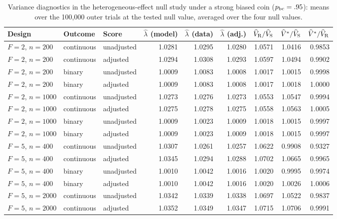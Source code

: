 \documentclass[12pt,a4paper]{article}
\theoremstyle{definition}
\theoremstyle{remark}\newtheorem{remark}{Remark}
\numberwithin{equation}{section}
\begin{document}
\begin{table}[!htbp]\centering
\caption{Variance diagnostics in the heterogeneous-effect null study under a strong biased coin ($p_{\rm bc}=.95$): means over the 100,000 outer trials at the tested null value, averaged over the four null values.}
\label{tab:supp-hetero-diag-stress}
\begin{threeparttable}\begin{singlespace}\footnotesize\setlength{\tabcolsep}{3pt}
\begin{tabular}{@{}lllrrrrrr@{}}\toprule
Design & Outcome & Score & $\widehat\lambda$ (model) & $\widehat\lambda$ (data) & $\widehat\lambda$ (adj.) & $\widehat V_{\rm R}/\widehat V_{\rm S}$ & $\widehat V^{*}/\widehat V_{\rm S}$ & $\widehat V^{*}/\widehat V_{\rm R}$\\\midrule
$F=2$, $n=200$ & continuous & unadjusted & 1.0281 & 1.0295 & 1.0280 & 1.0571 & 1.0416 & 0.9853\\
$F=2$, $n=200$ & continuous & adjusted & 1.0294 & 1.0308 & 1.0293 & 1.0597 & 1.0494 & 0.9902\\
$F=2$, $n=200$ & binary & unadjusted & 1.0009 & 1.0083 & 1.0008 & 1.0017 & 1.0015 & 0.9998\\
$F=2$, $n=200$ & binary & adjusted & 1.0009 & 1.0083 & 1.0008 & 1.0017 & 1.0018 & 1.0000\\
$F=2$, $n=1000$ & continuous & unadjusted & 1.0273 & 1.0276 & 1.0273 & 1.0553 & 1.0547 & 0.9994\\
$F=2$, $n=1000$ & continuous & adjusted & 1.0275 & 1.0278 & 1.0275 & 1.0558 & 1.0563 & 1.0005\\
$F=2$, $n=1000$ & binary & unadjusted & 1.0009 & 1.0023 & 1.0009 & 1.0018 & 1.0015 & 0.9997\\
$F=2$, $n=1000$ & binary & adjusted & 1.0009 & 1.0023 & 1.0009 & 1.0018 & 1.0015 & 0.9997\\
$F=5$, $n=400$ & continuous & unadjusted & 1.0307 & 1.0261 & 1.0257 & 1.0622 & 0.9908 & 0.9327\\
$F=5$, $n=400$ & continuous & adjusted & 1.0345 & 1.0294 & 1.0288 & 1.0702 & 1.0665 & 0.9965\\
$F=5$, $n=400$ & binary & unadjusted & 1.0010 & 1.0042 & 1.0016 & 1.0020 & 0.9995 & 0.9974\\
$F=5$, $n=400$ & binary & adjusted & 1.0010 & 1.0042 & 1.0016 & 1.0020 & 1.0026 & 1.0006\\
$F=5$, $n=2000$ & continuous & unadjusted & 1.0342 & 1.0339 & 1.0338 & 1.0697 & 1.0522 & 0.9837\\
$F=5$, $n=2000$ & continuous & adjusted & 1.0352 & 1.0349 & 1.0347 & 1.0715 & 1.0706 & 0.9991\\

\end{tabular}
\end{singlespace}
\end{threeparttable}
\end{table}
\end{document}
